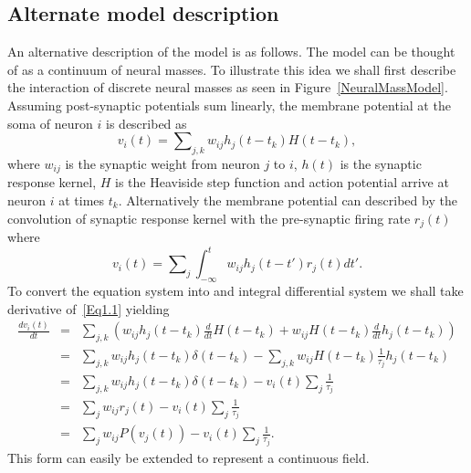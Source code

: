 \documentclass[onecolumn,draftcls]{IEEEtran}
\begin{document}
\subsection{Alternate model description}


An alternative description of the model is as follows. The model can be thought of as a continuum of neural masses. To illustrate this idea we shall first describe the interaction of discrete neural masses as seen in Figure~\ref{NeuralMassModel}. Assuming post-synaptic potentials sum linearly, the membrane potential at the soma of neuron $i$ is described as
\begin{equation}\label{Eq1.1}
{v_i}\left( t \right) = \sum\nolimits_{j,k} {{w_{ij}}{h_{j}}\left( t - {t_k}\right)} H\left( {t - {t_k}} \right),
\end{equation}
where $w_{ij}$ is the synaptic weight from neuron $j$ to $i$, $h(t)$ is the synaptic response kernel, $H$ is the Heaviside step function and action potential arrive at neuron $i$ at times $t_k$. Alternatively the membrane potential can described by the convolution of synaptic response kernel with the pre-synaptic firing rate $r_j(t)$ where
\begin{equation}\label{1.2}
{v_i}\left( t \right) = \sum\nolimits_j {\int_{ - \infty }^t {{w_{ij}}{h_j}\left( {t - t'} \right){r_j}\left( t \right)} } dt'.
\end{equation}
To convert the equation system into and integral differential system we shall take derivative of~\ref{Eq1.1} yielding
\begin{eqnarray}
  \frac{{d{v_i}\left( t \right)}}{{dt}} &=& \sum\nolimits_{j,k} {\left( {{w_{ij}}{h_j}\left( t- {t_k} \right)\frac{d}{{dt}}H\left( {t - {t_k}} \right) + {w_{ij}}H\left( {t - {t_k}} \right)\frac{d}{{dt}}{h_j}\left( t- {t_k} \right)} \right)} \nonumber \\
   &=& \sum\nolimits_{j,k} {{w_{ij}}{h_j}\left( t- {t_k} \right)\delta \left( {t - {t_k}} \right)}  - \sum\nolimits_{j,k} {{w_{ij}}H\left( {t - {t_k}} \right)\frac{1}{{{\tau _j}}}{h_j}\left( t- {t_k} \right)}   \nonumber \\
   &=& \sum\nolimits_{j,k} {{w_{ij}}{h_j}\left( t- {t_k} \right)\delta \left( {t - {t_k}} \right)}  - {v_i}\left( t \right)\sum\nolimits_j {\frac{1}{{{\tau _j}}}} \nonumber  \\
   &=& \sum\nolimits_j {{w_{ij}}{r_j}\left( t \right)}  - {v_i}\left( t \right)\sum\nolimits_j {\frac{1}{{{\tau _j}}}} \nonumber \\
   &=& \sum\nolimits_j {{w_{ij}}P\left( {{v_j}\left( t \right)} \right)}  - {v_i}\left( t \right)\sum\nolimits_j {\frac{1}{{{\tau _j}}}}.
\end{eqnarray}
This form can easily be extended to represent a continuous field.
\end{document}
